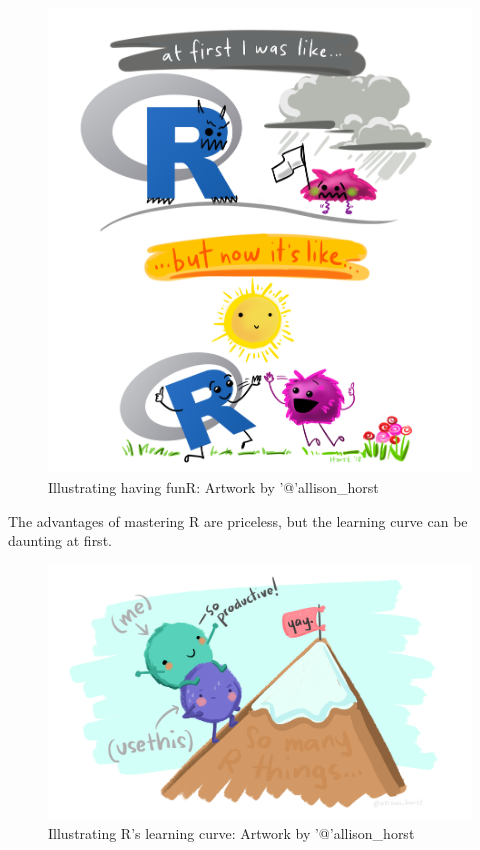 \documentclass[
]{book}
\begin{document}
\begin{figure}
\centering
\includegraphics{extfiles/r_first_then.png}
\caption{Illustrating having funR: Artwork by '@'allison\_horst}
\end{figure}

The advantages of mastering R are priceless, but the learning curve can be daunting at first.

\begin{figure}
\centering
\includegraphics{extfiles/usethis.png}
\caption{Illustrating R's learning curve: Artwork by '@'allison\_horst}
\end{figure}
\end{document}
